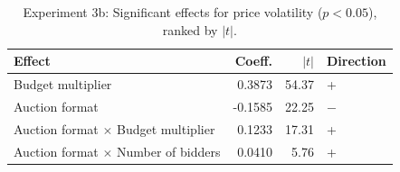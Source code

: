 \begin{table}[H]
\centering
\caption{Experiment 3b: Significant effects for price volatility ($p < 0.05$), ranked by $|t|$.}
\label{tab:exp3b_ranked_vol}
\begin{tabular}{lrrl}
\toprule
\textbf{Effect} & \textbf{Coeff.} & \textbf{$|t|$} & \textbf{Direction} \\
\midrule
Budget multiplier & 0.3873 & 54.37 & + \\
Auction format & -0.1585 & 22.25 & $-$ \\
Auction format $\times$ Budget multiplier & 0.1233 & 17.31 & + \\
Auction format $\times$ Number of bidders & 0.0410 & 5.76 & + \\
\bottomrule
\end{tabular}
\end{table}
